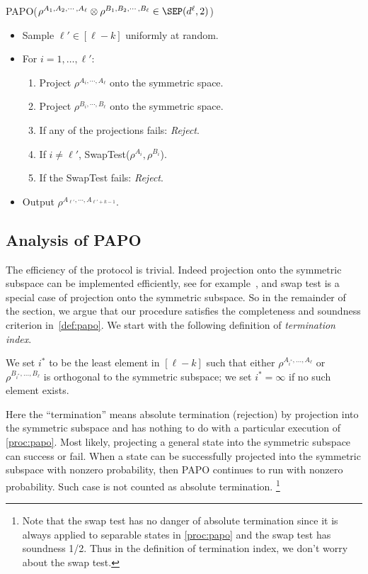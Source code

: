 \begin{algorithm}[H]{PAPO}{($\rho^{A_1,A_2,\cdots, A_\ell}\otimes \rho^{B_1, B_2,\cdots, B_\ell} \in \SEP(d^\ell,2)$)}
     \begin{itemize}
      \item Sample $\ell' \in [\ell-k]$ uniformly at random.
      \item For $i=1,\ldots,\ell'$: \begin{enumerate}
           \item Project $\rho^{A_i, \cdots, A_\ell}$ onto the symmetric space.
           \item Project $\rho^{B_i,\cdots, B_\ell}$ onto the symmetric space.
           \item If any of the projections fails:  \emph{Reject}.
           \item If $i\not=\ell'$, SwapTest($\rho^{A_i}, \rho^{B_i}$).
           \item If the SwapTest fails:  \emph{Reject}.
          \end{enumerate}
      \item Output $\rho^{A_{\ell'},\cdots, A_{\ell'+k-1}}$.
     \end{itemize}
     \caption{PAPO}\label{proc:papo}
\end{algorithm}

\subsection{Analysis of PAPO}
The efficiency of the protocol is trivial. Indeed projection onto the symmetric subspace can be implemented efficiently, see for example~\cite{BBDEJM97}, and swap test is a special case of projection onto the symmetric subspace. So in the remainder of the
section, we argue that our procedure satisfies the completeness and
soundness criterion in~\cref{def:papo}. We start with the following
definition of \emph{termination index}.

\begin{definition}\label{def:term_index}
  We set $i^*$ to be the least element in $[\ell-k]$ such that either $\rho^{A_{i^*},\ldots, A_\ell}$ or  $\rho^{B_{i^*},\ldots, B_\ell}$
  is orthogonal to the symmetric subspace; we set $i^*=\infty$ if no such element exists.
\end{definition}
Here the ``termination'' means absolute termination (rejection) by projection into the symmetric subspace and has nothing to do with a particular execution of \cref{proc:papo}.
Most likely, projecting a general state into the symmetric subspace can success or fail. 
When a state can be successfully projected into the symmetric subspace with nonzero probability, then PAPO  continues to run with nonzero probability. Such case is not counted as absolute termination. \footnote{Note that the swap test has no danger of absolute termination since it is always applied to separable states in \cref{proc:papo} and the swap test has soundness 1/2. Thus in the definition of termination index, we don't worry about the swap test.}

